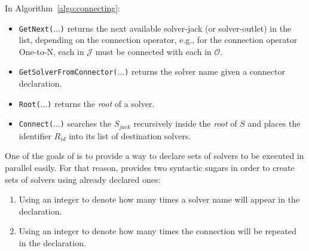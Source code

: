 In Algorithm~\ref{algo:connecting}:
\begin{itemize}
\item \texttt{GetNext($\dots$)} returns the next available solver-jack (or solver-outlet) in the list, depending on the connection operator, e.g., for the connection operator One-to-N, each \jack{} in $\mathcal{J}$ must be connected with each \outlet{} in $\mathcal{O}$.
\item \texttt{GetSolverFromConnector($\dots$)} returns the solver name given a connector declaration.
\item \texttt{Root($\dots$)} returns the {\it root} \cm{} of a solver.
\item \texttt{Connect($\dots$)} %
searches the \om{} $S_{jack}$ recursively inside the {\it root} \cm{} of $S$ and places the identifier $R_{id}$ into its list of destination solvers.
\end{itemize}


\separation

One of the goals of \posl{} is to provide a way to declare sets of solvers to be executed in parallel easily. For that reason, \posl{} provides two syntactic sugars %
in order to create sets of solvers using already declared ones:
\begin{enumerate}
\item Using an integer to denote how many times a solver name will appear in the declaration.
\item Using an integer to denote how many times the connection will be repeated in the declaration.
\end{enumerate}

